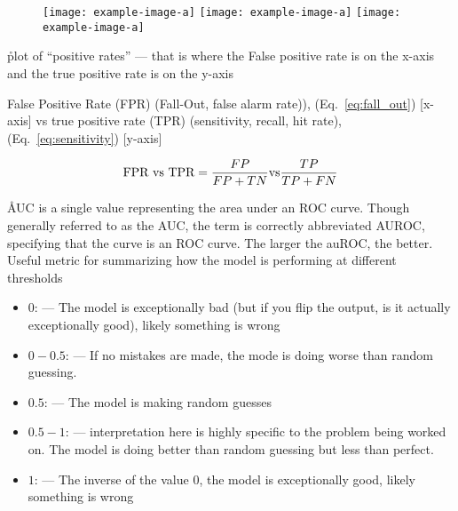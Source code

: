 \begin{figure}[htp]
	\centering
	\texttt{[image: example-image-a]}\hfil
	\texttt{[image: example-image-a]}\hfil
	\texttt{[image: example-image-a]}\hfil
	\caption{}
	\label{fig:auroc_curves}
\end{figure}


\r{plot of ``positive rates'' --- that is where the False positive rate is on the x-axis and the true positive rate is on the y-axis}

False Positive Rate (FPR) (Fall-Out, false alarm rate)), (Eq.~\ref{eq:fall_out}) [x-axis] vs true positive rate (TPR) (sensitivity, recall, hit rate), (Eq.~\ref{eq:sensitivity}) [y-axis]

\begin{equation}
\textmd{FPR} \textmd{ vs } \textmd{TPR} =	{\frac{FP}{FP+TN}} \textmd{vs} {\frac{TP}{TP+FN}} 
	\label{eq:roc}
\end{equation}

\r{AUC is a single value representing the area under an ROC curve. Though generally referred to as the AUC, the term is correctly abbreviated AUROC, specifying that the curve is an ROC curve. The larger the auROC, the better. Useful metric for summarizing how the model is performing at different thresholds}


\begin{itemize}[noitemsep,topsep=0pt]
	\item $0$: --- The model is exceptionally bad (but if you flip the output, is it actually exceptionally good), likely something is wrong
	\item $0 - 0.5$: --- If no mistakes are made, the mode is doing worse than random guessing.
	\item $0.5$: --- The model is making random guesses
	\item $0.5 - 1$: --- interpretation here is highly specific to the problem being worked on. The model is doing better than random guessing but less than perfect.
	\item $1$: --- The inverse of the value $0$, the model is exceptionally good, likely something is wrong
\end{itemize}

